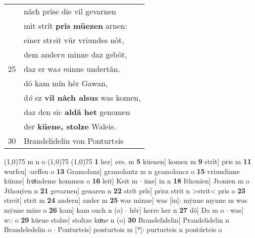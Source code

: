 \documentclass[8pt,a4paper,notitlepage]{article}
\begin{document}
\begin{table}[ht]
\begin{minipage}[t]{0.5\linewidth}
\begin{tabular}{rl}
 & nâch prîse die vil gevarnen\\ 
 & mit strît \textbf{prîs} \textbf{müezen} arnen:\\ 
 & einer str\textit{e}it vür vriundes nôt,\\ 
 & dem ander\textit{n} minne daz gebôt,\\ 
25 & daz er wa\textit{s} \textit{m}inne undertân.\\ 
 & dô kam mîn hêr Gawan,\\ 
 & d\textit{ô} ez \textbf{vil nâch alsus} was komen,\\ 
 & daz den sic \textbf{aldâ het} genomen\\ 
 & der \textbf{küene, stolze} Waleis.\\ 
30 & Brandelidelin von Ponturt\textit{e}is\\ 
\end{tabular}
\scriptsize
\line(1,0){75} \newline
m n o \newline
\line(1,0){75} \newline
\newline
\line(1,0){75} \newline
\textbf{1} her] \textit{om.} m \textbf{5} küenen] komen m \textbf{9} strît] pris m \textbf{11} wurfen] :urffen o \textbf{13} Gramolanz] gramolantz m n gramolancz o \textbf{15} vriundinne künne] fruͯindeme kommen o \textbf{16} leit] Keit m  $\cdot$ ime] in n \textbf{18} Ithonien] Jtonien m o Jthonẏen n \textbf{21} gevarnen] genaren n \textbf{22} strît prîs] prisz strit n >strit< pris o \textbf{23} streit] strit m \textbf{24} andern] ander m \textbf{25} was minne] was [in]: mẏnne mynne m was mẏnne mine o \textbf{26} kam] kam ouch n (o)  $\cdot$ hêr] herre her n \textbf{27} dô] Da m o  $\cdot$ was] w:: o \textbf{29} küene stolze] stoltze kuͯne n (o) \textbf{30} Brandelidelin] Prandelidelin n Brandeledelin o  $\cdot$ Ponturteis] ponturtois m [*]: purturteis n pontúrteis o \newline
\end{minipage}
\end{table}
\newpage
\end{document}
